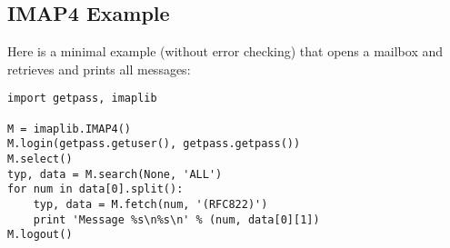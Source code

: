 \subsection{IMAP4 Example \label{imap4-example}}

Here is a minimal example (without error checking) that opens a
mailbox and retrieves and prints all messages:

\begin{verbatim}
import getpass, imaplib

M = imaplib.IMAP4()
M.login(getpass.getuser(), getpass.getpass())
M.select()
typ, data = M.search(None, 'ALL')
for num in data[0].split():
    typ, data = M.fetch(num, '(RFC822)')
    print 'Message %s\n%s\n' % (num, data[0][1])
M.logout()
\end{verbatim}
